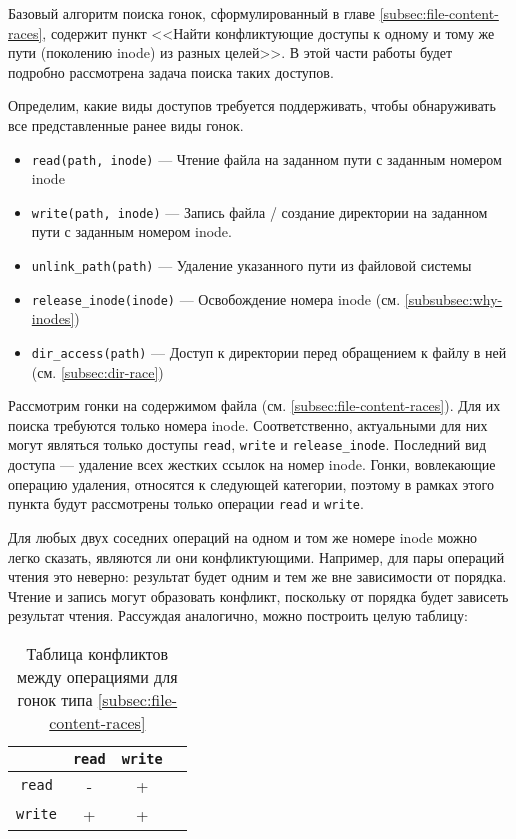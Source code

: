 Базовый алгоритм поиска гонок, сформулированный в главе \ref{subsec:file-content-races}, содержит пункт <<Найти конфликтующие доступы к одному и тому же пути (поколению inode) из разных целей>>. В этой части работы будет подробно рассмотрена задача поиска таких доступов.

Определим, какие виды доступов требуется поддерживать, чтобы обнаруживать все представленные ранее виды гонок.

\begin{itemize}
    \item \texttt{read(path, inode)} --- Чтение файла на заданном пути с заданным номером inode
    \item \texttt{write(path, inode)} --- Запись файла / создание директории на заданном пути с заданным номером inode.
    \item \texttt{unlink\_path(path)} --- Удаление указанного пути из файловой системы
    \item \texttt{release\_inode(inode)} --- Освобождение номера inode (см. \ref{subsubsec:why-inodes})
    \item \texttt{dir\_access(path)} --- Доступ к директории перед обращением к файлу в ней (см. \ref{subsec:dir-race})
\end{itemize}

Рассмотрим гонки на содержимом файла (см. \ref{subsec:file-content-races}). Для их поиска требуются только номера inode. Соответственно, актуальными для них могут являться только доступы \texttt{read}, \texttt{write} и \texttt{release\_inode}. Последний вид доступа --- удаление всех жестких ссылок на номер inode. Гонки, вовлекающие операцию удаления, относятся к следующей категории, поэтому в рамках этого пункта будут рассмотрены только операции \texttt{read} и \texttt{write}.

Для любых двух соседних операций на одном и том же номере inode можно легко сказать, являются ли они конфликтующими. Например, для пары операций чтения это неверно: результат будет одним и тем же вне зависимости от порядка. Чтение и запись могут образовать конфликт, поскольку от порядка будет зависеть результат чтения. Рассуждая аналогично, можно построить целую таблицу:

\begin{table}[htbp]
    \centering
    \begin{tabular}{cccc}
        \toprule
        & \texttt{read} & \texttt{write} \\
        \midrule
        \texttt{read} & - & +\\
        \texttt{write} & + & +\\
        \bottomrule
    \end{tabular}
    \caption{Таблица конфликтов между операциями для гонок типа \ref{subsec:file-content-races}}
    \label{fig:conflict-table}
\end{table}

